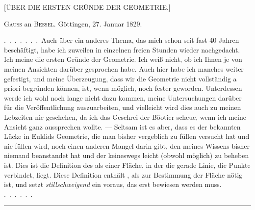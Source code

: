 \clearpage{}
\begin{center}
[ÜBER DIE ERSTEN GRÜNDE DER GEOMETRIE.]
\end{center}

\begin{center}
\textsc{Gauss} an \textsc{Bessel}. Göttingen, 27. Januar 1829.
\end{center}

.\ .\ .\ .\ .\ .\ .\ Auch über ein anderes Thema, das mich schon seit fast 40 Jahren
beschäftigt, habe ich zuweilen in einzelnen freien Stunden wieder nachgedacht. Ich
meine die ersten Gründe der Geometrie. Ich weiß nicht, ob ich Ihnen je von
meinen Ansichten darüber gesprochen habe. Auch hier habe ich manches weiter
gefestigt, und meine Überzeugung, dass wir die Geometrie nicht vollständig a priori begründen können, ist, wenn möglich, noch fester geworden.
Unterdessen werde ich wohl noch lange nicht dazu kommen, meine  Untersuchungen darüber für die Veröffentlichung auszuarbeiten, und vielleicht wird dies auch zu meinen Lebzeiten nie geschehen,
da ich das Geschrei der Böotier scheue, wenn ich meine Ansicht ganz aussprechen wollte. --- Seltsam ist es aber, dass es  der bekannten Lücke in
Euklids Geometrie, die man bisher vergeblich zu füllen versucht hat und nie
füllen wird, noch einen anderen Mangel darin gibt, den meines
Wissens bisher niemand beanstandet hat und der keineswegs leicht
(obwohl möglich) zu beheben ist. Dies ist die Definition des  als einer Fläche,
in der die gerade Linie, die  Punkte verbindet,  liegt. Diese
Definition enthält , als zur Bestimmung der Fläche nötig ist, und setzt \emph{stillschweigend} ein  voraus, das erst bewiesen werden muss. .\ .\ .\ .\ .\ .

\rule{4cm}{0.5pt}


